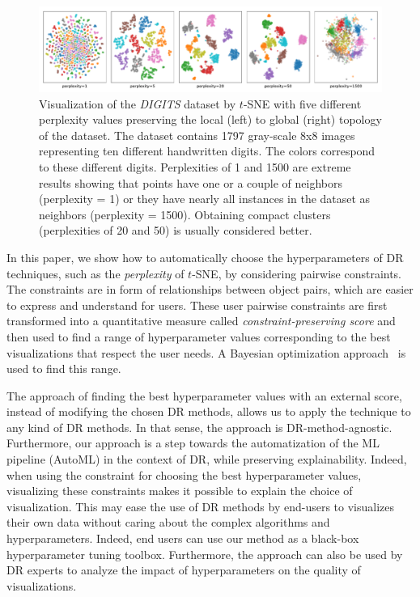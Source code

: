 \begin{figure}%
  \centering
  \includegraphics[width=\linewidth]{figures/MNIST-SMALL_examples}
  \caption{Visualization of the \emph{DIGITS} dataset by $t$-SNE with five different perplexity values preserving the local (left) to global (right) topology of the dataset. The dataset contains 1797 gray-scale 8x8 images representing ten different handwritten digits. The colors correspond to these different digits. Perplexities of 1 and 1500 are extreme results showing that points have one or a couple of neighbors (perplexity = 1) or they have nearly all instances in the dataset as neighbors (perplexity = 1500). Obtaining compact clusters (perplexities of 20 and 50) is usually considered better.}
  \label{fig:mnist_perps}
\end{figure}

In this paper, we show how to automatically choose the hyperparameters of DR techniques, such as the {\it perplexity} of $t$-SNE, by considering pairwise constraints.
The constraints are in form of relationships between object pairs, which are easier to express and understand for users. These user pairwise constraints are first transformed into a quantitative measure called \emph{constraint-preserving score} and then used to find a range of hyperparameter values corresponding to the best visualizations that respect the user needs. A Bayesian optimization approach~\cite{mockus1974BO, mockus1978application} is used to find this range.

The approach of finding the best hyperparameter values with an external score, instead of modifying the chosen DR methods, allows us to apply the technique to any kind of DR methods. In that sense, the approach is DR-method-agnostic. Furthermore, our approach is a step towards the automatization of the ML pipeline (AutoML) in the context of DR, while preserving explainability. Indeed, when using the constraint for choosing the best hyperparameter values, visualizing these constraints makes it possible to explain the choice of visualization. This may ease the use of DR methods by end-users to visualizes their own data without caring about the complex algorithms and hyperparameters. Indeed, end users can use our method as a black-box hyperparameter tuning toolbox. Furthermore, the approach can also be used by DR experts to analyze the impact of hyperparameters on the quality of visualizations.

